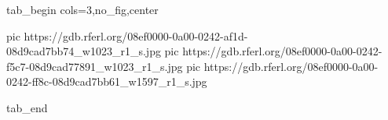 
 
 
 
 

\ifcmt
  tab_begin cols=3,no_fig,center

     pic https://gdb.rferl.org/08ef0000-0a00-0242-af1d-08d9cad7bb74_w1023_r1_s.jpg
		 pic https://gdb.rferl.org/08ef0000-0a00-0242-f5c7-08d9cad77891_w1023_r1_s.jpg
		 pic https://gdb.rferl.org/08ef0000-0a00-0242-ff8c-08d9cad7bb61_w1597_r1_s.jpg

  tab_end
\fi
